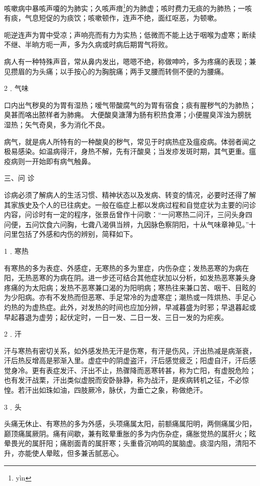 \documentclass[12pt,UTF8]{ctexbook}
\begin{document}
咳嗽病中暴咳声嗄的为肺实；久咳声瘖\footnote{y\`in}的为肺虚；咳时费力无痰的为肺热；一咳有痰，气息短促的为痰饮；咳嗽顿作，连声不绝，面红呕恶，为顿嗽。

呃逆连声为胃中受凉；声响亮而有力为实热；低微而不能上达于咽喉为虚寒；断续不继、半晌方呃一声，多为久病或时病后期胃气将败。

病人有一种特殊声音，常从鼻内发出，嗯嗯不绝，称做呻吟，多为疼痛的表现；兼见攒眉的为头痛；以手按心的为胸脘痛；两手叉腰而转侧不便的为腰痛。

2﹒气味

口内出气秽臭的为胃有湿热；嗳气带酸腐气的为胃有宿食；痰有腥秽气的为肺热；臭甚而咯出脓样者为肺痈。
大便酸臭溏薄为肠有积热食滞；小便腥臭浑浊为膀胱湿热；矢气奇臭，多为消化不良。

病气，就是病人所特有的一种酸臭的秽气，常见于时病热症及瘟疫病。体弱者闻之极易感染。如温病得汗，身热不解，先有汗酸臭；当发疹发斑时期，其气更重。瘟疫病则一开始即有病气触鼻。

三、问 诊

诊病必须了解病人的生活习惯、精神状态以及发病、转变的情况，必要时还得了解其家族史及个人的已往病史。一般在临症上都以发病过程和自觉症状为主要的问诊内容，问诊时有一定的程序，张景岳曾作十问歌：“一问寒热二问汗，三问头身四问便，五问饮食六问胸，七聋八渴俱当辨，九因脉色察阴阳，十从气味章神见。”十问里包括了外感和内伤的辨别，简释如下。

1﹒寒热

有寒热的多为表症、外感症，无寒热的多为里症，内伤杂症；发热恶寒的为病在阳，无热恶寒的为病在阴。进一步还可结合其他症状加以分析，如发热恶寒兼头身疼痛的为太阳病；发热不恶寒兼口渴的为阳明病；寒热往来兼口苦、咽干、目眩的为少阳病。亦有不发热而但恶寒、手足常冷的为虚寒症；潮热或一阵烘热、手足心灼热的为虚热症。此外，对发热的时间也应加分辨，早减暮盛为时邪；早退暮起或早起暮退为虚劳；起伏定时，一日一发、二日一发、三日一发的为疟疾。

2﹒汗

汗与寒热有密切关系，如外感发热无汗是伤寒，有汗是伤风，汗出热减是病渐衰，汗后热反增高是邪渐入里。虚症中的阴虚盗汗，汗后感觉疲乏；阳虚自汗，汗后感觉身冷。更有表症发汗、汗出不止，热骤降而恶寒转甚，称为亡阳，有虚脱危险；也有发汗战栗，汗出类似虚脱而安卧脉静，称为战汗，是疾病转机之征，不必惊惶。若汗出如珠如油，四肢厥冷，脉伏，为垂亡之象，称做绝汗。

3﹒头

头痛无休止、有寒热的多为外感，头项痛属太阳，前额痛属阳明，两侧痛属少阳，巅顶痛属厥阴。痛有间歇，兼有眩晕重胀的多为内伤杂症，痛胀觉热的属肝火；眩晕畏光的属肝阳；痛剧面青的属肝寒；头重昏沉响鸣的属脑虚。痰湿内阻，清阳不升，亦能使人晕眩，但多兼舌腻恶心。
\end{document}
